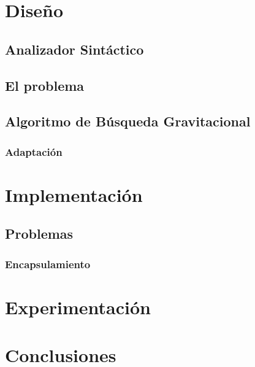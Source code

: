 \documentclass[a4paper]{report}
\begin{document}
  \chapter{Dise\~no}

  \section{Analizador Sint\'actico}

  \section{El problema}

  \section{Algoritmo de B\'usqueda Gravitacional}

  \subsection{Adaptaci\'on}

  \chapter{Implementaci\'on}

  \section{Problemas}

  \subsection{Encapsulamiento}

  \chapter{Experimentaci\'on}

  \chapter{Conclusiones}

  {}
  
\end{document}
